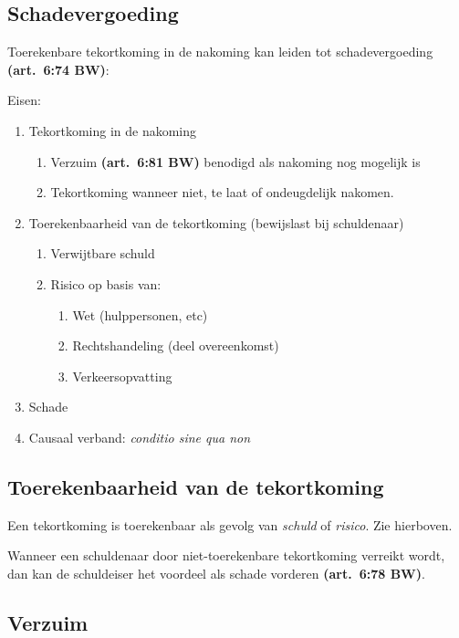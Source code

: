 \documentclass[a4paper]{article}
\newcommand{\art}[1]{\textbf{(art.~#1 BW)}\xspace}
\begin{document}
\subsection{Schadevergoeding}

Toerekenbare tekortkoming in de nakoming kan leiden tot schadevergoeding
\art{6:74}:

Eisen:
\begin{enumerate}
  \item Tekortkoming in de nakoming
    \begin{enumerate}
      \item Verzuim \art{6:81} benodigd als nakoming nog mogelijk is
      \item Tekortkoming wanneer niet, te laat of ondeugdelijk nakomen.
    \end{enumerate}
  \item Toerekenbaarheid van de tekortkoming (bewijslast bij schuldenaar)
    \begin{enumerate}
      \item Verwijtbare schuld
      \item Risico op basis van:
        \begin{enumerate}
          \item Wet (hulppersonen, etc)
          \item Rechtshandeling (deel overeenkomst)
          \item Verkeersopvatting
        \end{enumerate}
    \end{enumerate}
  \item Schade
  \item Causaal verband: \emph{conditio sine qua non}
\end{enumerate}

\subsection{Toerekenbaarheid van de tekortkoming}

Een tekortkoming is toerekenbaar als gevolg van \emph{schuld} of
\emph{risico}. Zie hierboven.

Wanneer een schuldenaar door niet-toerekenbare tekortkoming verreikt wordt,
dan kan de schuldeiser het voordeel als schade vorderen \art{6:78}.

\subsection{Verzuim}
\end{document}
